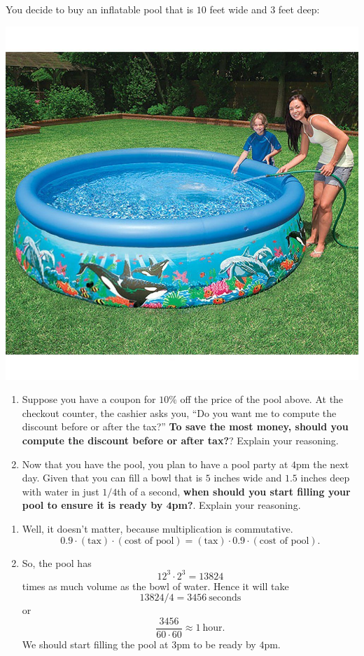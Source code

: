 \documentclass[nooutcomes,noauthor,handout,12pt]{ximera}
\begin{document}
\begin{question}
  You decide to buy an inflatable pool that is $10$ feet wide and $3$
  feet deep:
  \begin{center}
    \includegraphics[width=.4\textwidth]{tenFtPool.jpg}
  \end{center}
  \begin{enumerate}
    \item Suppose you have a coupon for $10\%$ off the price of the
      pool above. At the checkout counter, the cashier asks you, ``Do
      you want me to compute the discount before or after the tax?''
      \textbf{To save the most money, should you compute the discount
        before or after tax?}? Explain your reasoning.
    \item Now that you have the pool, you plan to have a pool party at
      $4$pm the next day. Given that you can fill a bowl that is $5$
      inches wide and $1.5$ inches deep with water in just $1/4$th of
      a second, \textbf{when should you start filling your pool to
        ensure it is ready by $\boldsymbol 4$pm?}.  Explain your
      reasoning.
  \end{enumerate}
  \begin{freeResponse}
    \begin{enumerate}
    \item Well, it doesn't matter, because multiplication is commutative.
      \[
      0.9 \cdot (\text{tax}) \cdot (\text{cost of pool})= (\text{tax})\cdot
      0.9\cdot (\text{cost of pool}).
      \]
    \item So, the pool has
      \[
      12^3 \cdot 2^3 = 13824
      \]
      times as much volume as the bowl of water. Hence it will take
      \[
      13824/4 = 3456 ~\text{seconds}
      \]
      or
      \[
      \frac{3456}{60\cdot 60} \approx 1~\text{hour}.
      \]
      We should start filling the pool at $3$pm to be ready by $4$pm.
    \end{enumerate}
  \end{freeResponse}
\end{question}
\mynewpage
\end{document}
